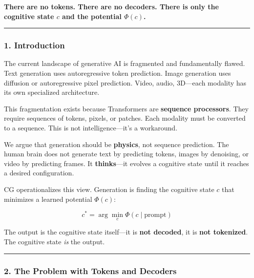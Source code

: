 \documentclass[
  11pt,
  a4paper,
]{article}
\begin{document}
\textbf{There are no tokens. There are no decoders. There is only the
cognitive state \(c\) and the potential \(\Phi(c)\).}

\begin{center}\rule{0.5\linewidth}{0.5pt}\end{center}

\subsubsection{1. Introduction}\label{introduction-3}

The current landscape of generative AI is fragmented and fundamentally
flawed. Text generation uses autoregressive token prediction. Image
generation uses diffusion or autoregressive pixel prediction. Video,
audio, 3D---each modality has its own specialized architecture.

This fragmentation exists because Transformers are \textbf{sequence
processors}. They require sequences of tokens, pixels, or patches. Each
modality must be converted to a sequence. This is not
intelligence---it's a workaround.

We argue that generation should be \textbf{physics}, not sequence
prediction. The human brain does not generate text by predicting tokens,
images by denoising, or video by predicting frames. It
\textbf{thinks}---it evolves a cognitive state until it reaches a
desired configuration.

CG operationalizes this view. Generation is finding the cognitive state
\(c\) that minimizes a learned potential \(\Phi(c)\):

\[
c^* = \arg\min_{c} \Phi(c \mid \text{prompt})
\]

The output is the cognitive state itself---it is \textbf{not decoded},
it is \textbf{not tokenized}. The cognitive state \emph{is} the output.

\begin{center}\rule{0.5\linewidth}{0.5pt}\end{center}

\subsubsection{2. The Problem with Tokens and
Decoders}\label{the-problem-with-tokens-and-decoders}
\end{document}

